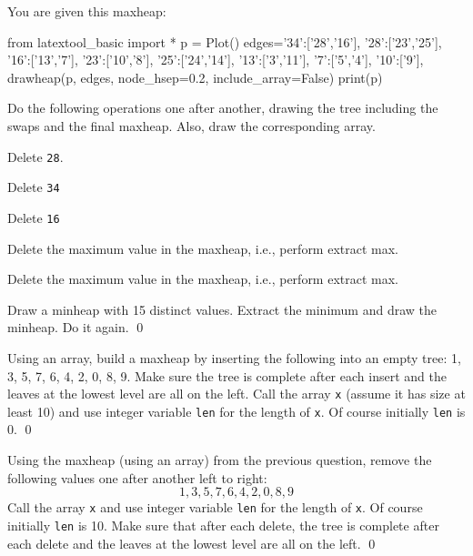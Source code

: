 \newpage
\begin{ex}
You are given this maxheap:

\begin{python}
from latextool_basic import *
p = Plot()
edges={'34':['28','16'],
       '28':['23','25'],
       '16':['13','7'],
       '23':['10','8'],
       '25':['24','14'],
       '13':['3','11'],
       '7':['5','4'],
       '10':['9'],
       }
drawheap(p, edges, node_hsep=0.2,
       include_array=False)
print(p)
\end{python}

Do the following operations one after another,
drawing the tree including the swaps
and the final
maxheap.
Also, draw the corresponding array.
\begin{tightlist}
  \item Delete \texttt{28}.
  \item Delete \texttt{34}
  \item Delete \texttt{16}
  \item Delete the maximum value in the maxheap, i.e., perform extract max.
  \item Delete the maximum value in the maxheap, i.e., perform extract max.
\end{tightlist}
\end{ex}

\newpage
\begin{ex}
  Draw a minheap with 15 distinct values.
  Extract the minimum and draw the minheap.
  Do it again.
  \qed
\end{ex}





\begin{ex}
Using an array, 
build a maxheap by inserting the following into an empty tree:
1, 3, 5, 7, 6, 4, 2, 0, 8, 9.
Make sure the tree is complete after each insert and the leaves
at the lowest level are all on the left.
Call the array \texttt{x}
(assume it has size at least 10)
and use integer variable \texttt{len}
for the length of \texttt{x}.
Of course initially \texttt{len} is 0.
\qed
\end{ex}

\begin{ex}
Using the maxheap (using an array) from the previous question,
remove the following values one after another left to right:
\[
1, 3, 5, 7, 6, 4, 2, 0, 8, 9
\]
Call the array \texttt{x} and use integer variable \texttt{len}
for the length of \texttt{x}.
Of course initially \texttt{len} is 10.
Make sure that after each delete, the tree is complete after each delete and 
the leaves
at the lowest level are all on the left.
\qed
\end{ex}

